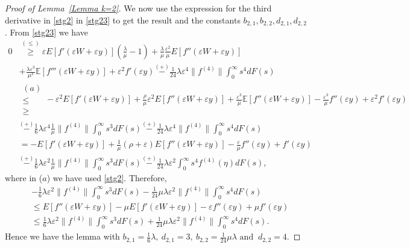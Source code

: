 \documentclass[11pt,letterpaper,reqno]{article}
\theoremstyle{thmstyleone}%
\theoremstyle{thmstyletwo}%
\theoremstyle{thmstylethree}%
\numberwithin{equation}{section}
\begin{document}
\begin{proof}[Proof of Lemma~\ref{Lemma k=2}]
We now use the expression for the third derivative in \eqref{stg2} in \eqref{stg23} to get the result and the constants $b_{2,1}, b_{2,2}, d_{2,1},d_{2,2}$.
From \eqref{stg23} we have
\begin{align*}
    0
   &\stackrel{(\leq)} {\geq} \varepsilon E[f'(\varepsilon W+\varepsilon y)]\left(\frac{\lambda}{\mu}-1\right)+\frac{\lambda}{\mu}\frac{\varepsilon^2}{\mu}E[f''(\varepsilon W+\varepsilon y)]\\
    &+\frac{\lambda \varepsilon^3}{\mu^3}\mathbb E[f'''(\varepsilon W+\varepsilon y)]+\varepsilon^2f'(\varepsilon y)\stackrel{(+)}{-}\frac{1}{24}\lambda \varepsilon^4 \|f^{(4)}\| \int_0^\infty s^4 dF(s)\\
   & \mathrel{\substack{(a)\\ \leq \\ \geq}}-\varepsilon^2 E[f'(\varepsilon W+\varepsilon y)]+\frac{\rho}{\mu}\varepsilon^2E[f''(\varepsilon W+\varepsilon y)]+\frac{\varepsilon^3}{\mu}\mathbb E[f''(\varepsilon W+\varepsilon y)]-\frac{\varepsilon^3}{\mu}f''(\varepsilon y)+\varepsilon^2f'(\varepsilon y)\\
    &\stackrel{(+)}{-}\frac{1}{6} \lambda \varepsilon^4 \frac{1}{\mu}\|f^{(4)}\|\int_0^\infty s^3 dF(s)\stackrel{(+)}{-}\frac{1}{24}\lambda \varepsilon^4 \|f^{(4)}\|\int_0^\infty s^4dF(s)\\
    &=-E[f'(\varepsilon W+\varepsilon y)]+\frac{1}{\mu}(\rho+\varepsilon)E[f''(\varepsilon W+\varepsilon y)]-\frac{\varepsilon}{\mu}f''(\varepsilon y)+f'(\varepsilon y)\\
     &\stackrel{(+)}{-}\frac{1}{6} \lambda \varepsilon^2 \frac{1}{\mu}\|f^{(4)}\|\int_0^\infty s^3 dF(s)
     \stackrel{(+)}{-}\frac{1}{24}\lambda \varepsilon^2 \int_0^\infty s^4 f^{(4)}(\eta)dF(s),
\end{align*}
where in ($a$) we have used \eqref{stg2}. Therefore,
\begin{align}\label{stg3}
   \nonumber  &-\frac{1}{6} \lambda \varepsilon^2 \|f^{(4)}\|\int_0^\infty s^3 dF(s)-\frac{1}{24}\mu \lambda \varepsilon^2 \|f^{(4)}\| \int_0^\infty s^4 dF(s) \nonumber \\
   &\leq E[f''(\varepsilon W+\varepsilon y)]-\mu E[f'(\varepsilon W+\varepsilon y)]-\varepsilon f''(\varepsilon y)+\mu f'(\varepsilon y) \nonumber\\
     &\leq\frac{1}{6} \lambda \varepsilon^2 \|f^{(4)}\|\int_0^\infty s^3 dF(s)+\frac{1}{24}\mu \lambda \varepsilon^2 \|f^{(4)}\| \int_0^\infty s^4 dF(s).
\end{align}
Hence we have the lemma with $b_{2,1}=\frac{1}{6}\lambda, \ d_{2,1}=3,\ b_{2,2}=\frac{1}{24}\mu \lambda \text{ and }\  d_{2,2}=4$. 

\end{proof}
\end{document}
